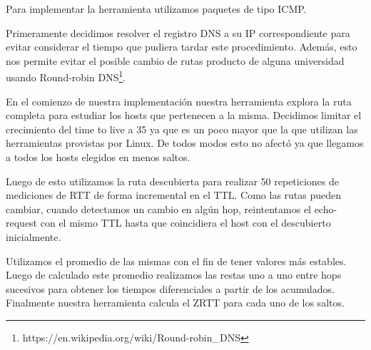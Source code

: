 Para implementar la herramienta utilizamos paquetes de tipo ICMP.

Primeramente decidimos resolver el registro DNS a su IP correspondiente para evitar considerar el tiempo que pudiera tardar este procedimiento. Además, esto nos permite evitar el posible cambio de rutas producto de alguna universidad usando Round-robin DNS\footnote{https://en.wikipedia.org/wiki/Round-robin_DNS}.

En el comienzo de nuestra implementación nuestra herramienta explora la ruta completa para estudiar los hosts que pertenecen a la misma.
Decidimos limitar el crecimiento del time to live a 35 ya que es un poco mayor que la que utilizan las herramientas provistas por Linux.
De todos modos esto no afectó ya que llegamos a todos los hosts elegidos en menos saltos.

Luego de esto utilizamos la ruta descubierta para realizar 50 repeticiones de mediciones de RTT de forma incremental en el TTL.
Como las rutas pueden cambiar, cuando detectamos un cambio en algún hop, reintentamos el echo-request con el mismo TTL hasta que coincidiera el host con el descubierto inicialmente.

Utilizamos el promedio de las mismas con el fin de tener valores más estables.
Luego de calculado este promedio realizamos las restas uno a uno entre hops sucesivos para obtener los tiempos diferenciales a partir de los acumulados.
Finalmente nuestra herramienta calcula el ZRTT para cada uno de los saltos.
